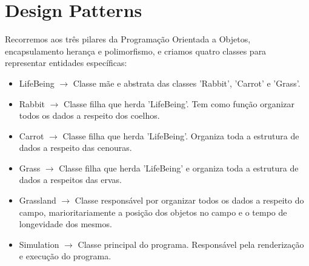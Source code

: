 \documentclass {report}
\begin{document}
\section* {Design Patterns}
	Recorremos aos três pilares da Programação Orientada a Objetos, encapsulamento 
	herança e polimorfismo, e criamos quatro classes para representar entidades
	específicas:
	\begin{itemize}
		\item	LifeBeing \(\rightarrow\) Classe mãe e abstrata das classes 'Rabbit',
					'Carrot' e 'Grass'.
		\item	Rabbit \(\rightarrow\) Classe filha que herda 'LifeBeing'. Tem como função 
					organizar todos os dados a respeito dos coelhos.
		\item	Carrot \(\rightarrow\) Classe filha que herda 'LifeBeing'. Organiza 
					toda a estrutura de dados a respeito das cenouras.
		\item	Grass \(\rightarrow\) Classe filha que herda 'LifeBeing' e organiza 
					toda a estrutura de dados a respeitos das ervas.
		\item Grassland \(\rightarrow\) Classe responsável por organizar todos os
					dados a respeito do campo, marioritariamente a posição dos objetos
					no campo e o tempo de longevidade dos mesmos.
		\item Simulation \(\rightarrow\) Classe principal do programa. Responsável
					pela renderização e execução do programa.
	\end{itemize}
\end{document}
